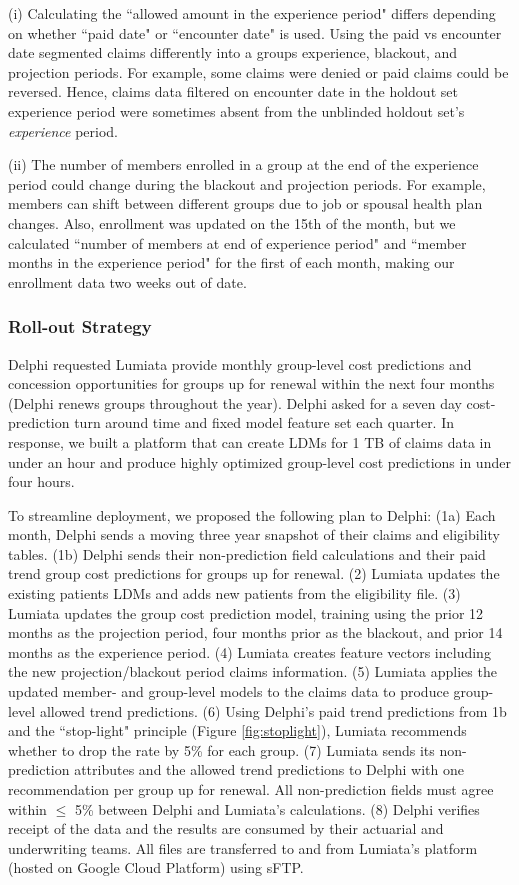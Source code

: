 \documentclass[letterpaper]{article} %
\begin{document}
(i) Calculating the ``allowed amount in the experience period" differs depending on whether ``paid date" or ``encounter date" is used. Using the paid vs encounter date segmented claims differently into a groups experience, blackout, and projection periods. For example, some claims were denied or paid claims could be reversed.  Hence, claims data filtered on encounter date in the holdout set experience period were sometimes absent from the unblinded holdout set's \textit{experience} period.

(ii)  The number of members enrolled in a group at the end of the experience period could change during the blackout and projection periods.  For example, members can shift between different groups due to job or spousal health plan changes. Also, enrollment was updated on the 15th of the month, but we calculated ``number of members at end of experience period" and ``member months in the experience period" for the first of each month, making our enrollment data two weeks out of date.

\subsubsection{Roll-out Strategy}\label{sec:deployment}
Delphi requested Lumiata provide monthly group-level cost predictions and concession opportunities for groups up for renewal within the next four months (Delphi renews groups throughout the year).  Delphi asked for a seven day cost-prediction turn around time and fixed model feature set each quarter.  In response, we built a platform that can create LDMs for 1 TB of claims data in under an hour and produce highly optimized group-level cost predictions in under four hours.  

To streamline deployment, we proposed the following plan to Delphi:
(1a) Each month, Delphi sends a moving three year snapshot of their claims and eligibility tables.  
(1b) Delphi sends their non-prediction field calculations and their paid trend group cost predictions for groups up for renewal.
(2) Lumiata updates the existing patients LDMs and adds new patients from the eligibility file.
(3) Lumiata updates the group cost prediction model, training using the prior 12 months as the projection period, four months prior as the blackout, and prior 14 months as the experience period.
(4) Lumiata creates feature vectors including the new projection/blackout period claims information.
(5) Lumiata applies the updated member- and group-level models to the claims data to produce group-level allowed trend predictions.
(6) Using Delphi's paid trend predictions from 1b and the ``stop-light" principle (Figure \ref{fig:stoplight}), Lumiata recommends whether to drop the rate by 5\% for each group.
(7) Lumiata sends its non-prediction attributes and the allowed trend predictions to Delphi with one recommendation per group up for renewal. All non-prediction fields must agree within $\leq$ 5\% between Delphi and Lumiata's calculations.
(8) Delphi verifies receipt of the data and the results are consumed by their actuarial and underwriting teams. 
All files are transferred to and from Lumiata's platform (hosted on Google Cloud Platform) using sFTP.
\end{document}
